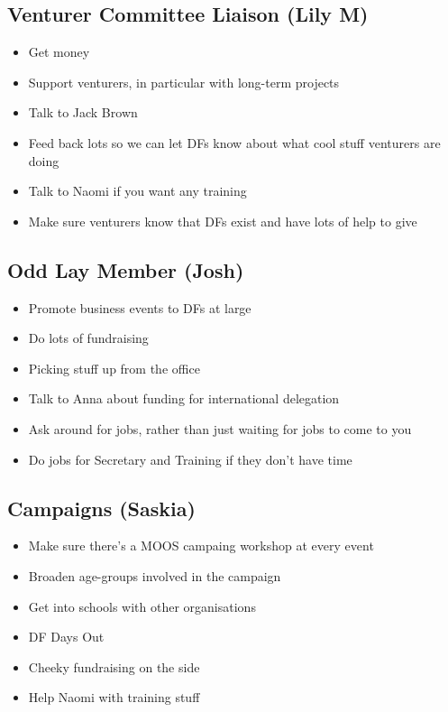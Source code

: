 \documentclass[a4paper, 11pt]{article} %
\begin{document}
\subsection{Venturer Committee Liaison (Lily M)}
\begin{itemize}
	\item Get money
	\item Support venturers, in particular with long-term projects
	\item Talk to Jack Brown
	\item Feed back lots so we can let DFs know about what cool stuff venturers are doing
	\item Talk to Naomi if you want any training
	\item Make sure venturers know that DFs exist and have lots of help to give
\end{itemize}

\subsection{Odd Lay Member (Josh)}
\begin{itemize}
	\item Promote business events to DFs at large
	\item Do lots of fundraising
	\item Picking stuff up from the office
	\item Talk to Anna about funding for international delegation
	\item Ask around for jobs, rather than just waiting for jobs to come to you
	\item Do jobs for Secretary and Training if they don't have time
\end{itemize}

\subsection{Campaigns (Saskia)}
\begin{itemize}
	\item Make sure there's a MOOS campaing workshop at every event
	\item Broaden age-groups involved in the campaign
	\item Get into schools with other organisations
	\item DF Days Out
	\item Cheeky fundraising on the side
	\item Help Naomi with training stuff
\end{itemize}
\end{document}
